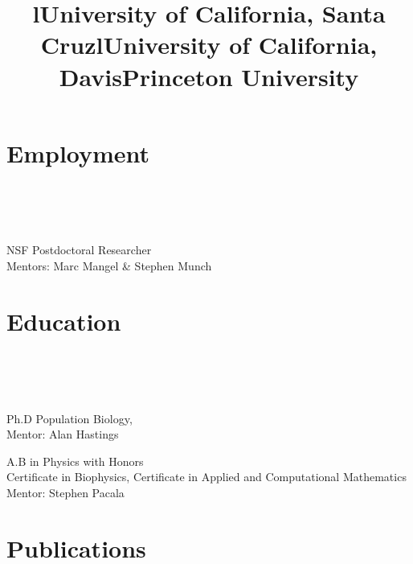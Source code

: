 \documentclass[margin]{res}
\begin{document}
\begin{resume}

\section{Employment}
\begin{format}
\title{l}\\\\
\body\\
\end{format}

\title{\textbf{University of California, Santa Cruz}}
\begin{position}
NSF Postdoctoral Researcher \\
Mentors: Marc Mangel \& Stephen Munch 
\end{position}

\section{Education}
\begin{format}
\title{l}\\\\
\body\\
\end{format}

\title{\textbf{University of California, Davis}}
\begin{position}
Ph.D Population Biology, \\
Mentor: Alan Hastings
\end{position}

\title{\textbf{Princeton University}}
\begin{position}
A.B  in Physics with Honors \\ 
Certificate in Biophysics, Certificate in Applied and Computational Mathematics\\
Mentor: Stephen Pacala
\end{position}

\section{Publications}


\end{resume}
\end{document}
